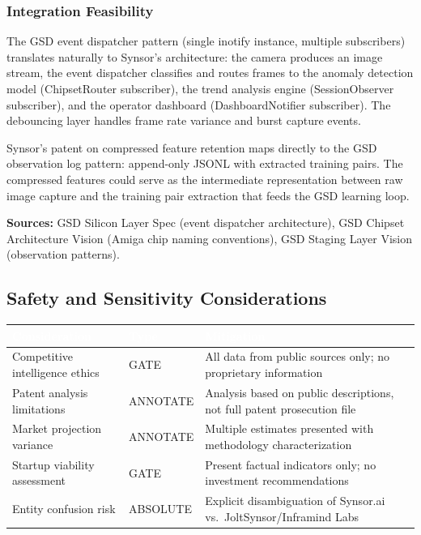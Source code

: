\documentclass[11pt,letterpaper]{article}
\newcommand{\tableheader}[1]{\textbf{\sffamily\textcolor{white}{#1}}}
\begin{document}
\subsubsection{Integration Feasibility}

The GSD event dispatcher pattern (single inotify instance, multiple subscribers) translates naturally to Synsor's architecture: the camera produces an image stream, the event dispatcher classifies and routes frames to the anomaly detection model (ChipsetRouter subscriber), the trend analysis engine (SessionObserver subscriber), and the operator dashboard (DashboardNotifier subscriber). The debouncing layer handles frame rate variance and burst capture events.

Synsor's patent on compressed feature retention maps directly to the GSD observation log pattern: append-only JSONL with extracted training pairs. The compressed features could serve as the intermediate representation between raw image capture and the training pair extraction that feeds the GSD learning loop.

\textbf{Sources:} GSD Silicon Layer Spec (event dispatcher architecture), GSD Chipset Architecture Vision (Amiga chip naming conventions), GSD Staging Layer Vision (observation patterns).

\subsection{Safety and Sensitivity Considerations}

\begin{center}
\begin{tabularx}{\textwidth}{L{3.5cm}L{2cm}X}
\toprule
{}
\tableheader{Consideration} & \tableheader{Type} & \tableheader{Mitigation} \\
\midrule
Competitive intelligence ethics & GATE & All data from public sources only; no proprietary information \\
Patent analysis limitations & ANNOTATE & Analysis based on public descriptions, not full patent prosecution file \\
Market projection variance & ANNOTATE & Multiple estimates presented with methodology characterization \\
Startup viability assessment & GATE & Present factual indicators only; no investment recommendations \\
Entity confusion risk & ABSOLUTE & Explicit disambiguation of Synsor.ai vs.\ JoltSynsor/Inframind Labs \\
\bottomrule
\end{tabularx}
\end{center}
\end{document}
